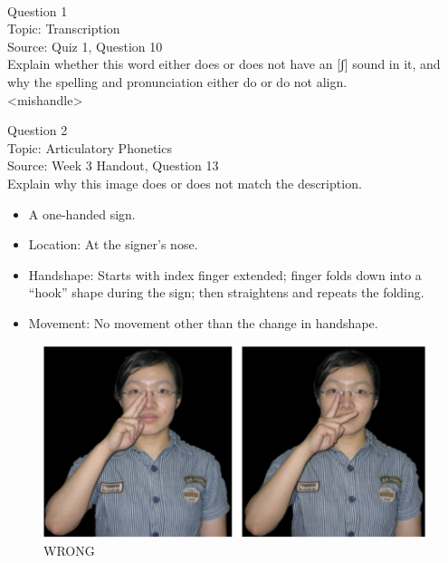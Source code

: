 \documentclass[12pt]{article}
\begin{document}
\newpage

\begin{center}
\textbf{{\color{red}{\HUGE END OF EXAM}}}\\

\end{center}
\newpage

\begin{center}
\textbf{{\color{blue}{\HUGE START OF EXAM\\}}}

\textbf{{\color{blue}{\HUGE Student ID: 30511\\}}}

\textbf{{\color{blue}{\HUGE \\}}}

\end{center}
\newpage

{\large Question 1}\\

Topic: Transcription\\
Source: Quiz 1, Question 10\\

Explain whether this word either does or does not have an [ʃ] sound in it, and why the spelling and pronunciation either do or do not align.\\

<mishandle>


\newpage

{\large Question 2}\\

Topic: Articulatory Phonetics\\
Source: Week 3 Handout, Question 13\\

Explain why this image does or does not match the description.\\

\begin{itemize} \item A one-handed sign. \item Location: At the signer’s nose. \item Handshape: Starts with index finger extended; finger folds down into a “hook” shape during the sign; then straightens and repeats the folding. \item Movement: No movement other than the change in handshape. \end{itemize}

\begin{figure}[H]
\includegraphics{../images/taiwansign_wrong.png}
\caption{WRONG}
\end{figure}
\end{document}
